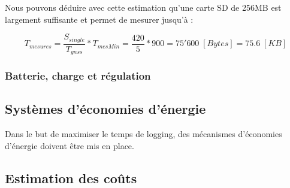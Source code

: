 Nous pouvons déduire avec cette estimation qu'une carte SD de 256MB est largement suffisante et permet de mesurer jusqu'à :

\begin{equation*}
	T_{mesures} = \frac{S_{single}}{T_{gnss}} * T_{mesMin} = \frac{420}{5} * 900 = 75'600 \; [Bytes] = 75.6 \; [KB]
\end{equation*}


\subsubsection{Batterie, charge et régulation} 

\subsection{Systèmes d'économies d'énergie} \label{ssec:Low-power}
Dans le but de maximiser le temps de logging, des mécanismes d'économies d'énergie doivent être mis en place. 

\subsection{Estimation des coûts} \label{ssec:Estimation-Couts}
